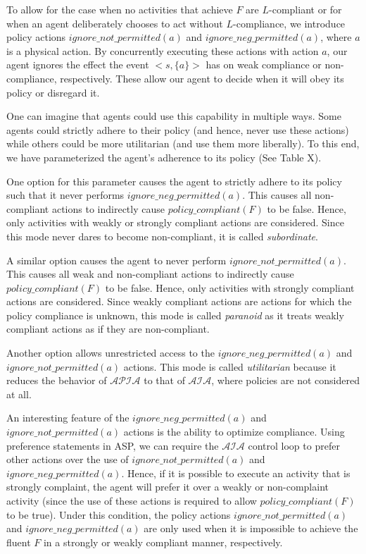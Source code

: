 To allow for the case when no activities that achieve $F$ are $L$-compliant or for when an agent deliberately chooses to act without $L$-compliance, we introduce policy actions $ignore\_not\_permitted(a)$ and $ignore\_neg\_permitted(a)$, where $a$ is a physical action.
By concurrently executing these actions with action $a$, our agent ignores the effect the event $<s, \{a\}>$ has on weak compliance or non-compliance, respectively.
These allow our agent to decide when it will obey its policy or disregard it.

One can imagine that agents could use this capability in multiple ways.
Some agents could strictly adhere to their policy (and hence, never use these actions) while others could be more utilitarian (and use them more liberally).
To this end, we have parameterized the agent's adherence to its policy (See Table X).

One option for this parameter causes the agent to strictly adhere to its policy such that it never performs $ignore\_neg\_permitted(a)$.
This causes all non-compliant actions to indirectly cause $policy\_compliant(F)$ to be false.
Hence, only activities with weakly or strongly compliant actions are considered.
Since this mode never dares to become non-compliant, it is called \textit{subordinate}.

A similar option causes the agent to never perform $ignore\_not\_permitted(a)$.
This causes all weak and non-compliant actions to indirectly cause $policy\_compliant(F)$ to be false.
Hence, only activities with strongly compliant actions are considered.
Since weakly compliant actions are actions for which the policy compliance is unknown, this mode is called \textit{paranoid} as it treats weakly compliant actions as if they are non-compliant.

Another option allows unrestricted access to the $ignore\_neg\_permitted(a)$ and $ignore\_not\_permitted(a)$ actions.
This mode is called \textit{utilitarian} because it reduces the behavior of $\mathcal{APIA}$ to that of $\mathcal{AIA}$, where policies are not considered at all.

An interesting feature of the $ignore\_neg\_permitted(a)$ and $ignore\_not\_permitted(a)$ actions is the ability to optimize compliance.
Using preference statements in ASP, we can require the $\mathcal{AIA}$ control loop to prefer other actions over the use of $ignore\_not\_permitted(a)$ and $ignore\_neg\_permitted(a)$.
Hence, if it is possible to execute an activity that is strongly complaint, the agent will prefer it over a weakly or non-complaint activity (since the use of these actions is required to allow $policy\_compliant(F)$ to be true).
Under this condition, the policy actions $ignore\_not\_permitted(a)$ and $ignore\_neg\_permitted(a)$ are only used when it is impossible to achieve the fluent $F$ in a strongly or weakly compliant manner, respectively.

